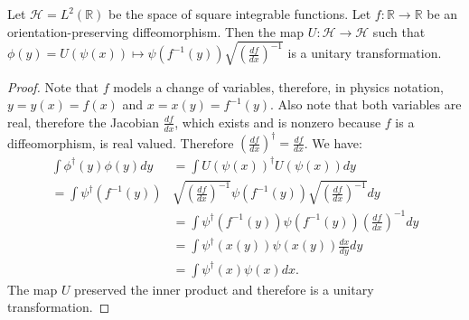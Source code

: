 \documentclass[10pt,twocolumn, nofootinbib]{revtex4-2}
\begin{document}
\begin{prop}
	Let $\mathcal{H} = L^2(\mathbb{R})$ be the space of square integrable functions. Let $f : \mathbb{R} \to \mathbb{R}$ be an orientation-preserving diffeomorphism. Then the map $U : \mathcal{H} \to \mathcal{H}$ such that 
	$\phi(y) = U(\psi(x)) \mapsto \psi(f^{-1}(y)) \sqrt{\left(\frac{df}{dx}\right)^{-1}}$ is a unitary transformation.
\end{prop}
\begin{proof}
	Note that $f$ models a change of variables, therefore, in physics notation, $y = y(x) = f(x)$ and $x = x(y) = f^{-1}(y)$. Also note that both variables are real, therefore the Jacobian $\frac{df}{dx}$, which exists and  is nonzero because $f$ is a diffeomorphism, is real valued. Therefore $\left(\frac{df}{dx}\right)^\dagger = \frac{df}{dx}$. We have:
	\begin{equation}
		\begin{aligned}
			\int \phi^\dagger(y) \phi(y) dy &= \int U(\psi(x))^\dagger U(\psi(x)) dy \\
			 = \int \psi^\dagger(f^{-1}(y)) &\sqrt{\left(\frac{df}{dx}\right)^{-1}}\psi(f^{-1}(y)) \sqrt{\left(\frac{df}{dx}\right)^{-1}} dy \\
			 &= \int \psi^\dagger(f^{-1}(y)) \psi(f^{-1}(y)) \left(\frac{df}{dx}\right)^{-1} dy \\
			 &= \int \psi^\dagger(x(y)) \psi(x(y)) \frac{dx}{dy} dy \\
			 &= \int \psi^\dagger(x) \psi(x) dx.
		\end{aligned}
	\end{equation}
	The map $U$ preserved the inner product and therefore is a unitary transformation.
\end{proof}
\end{document}
